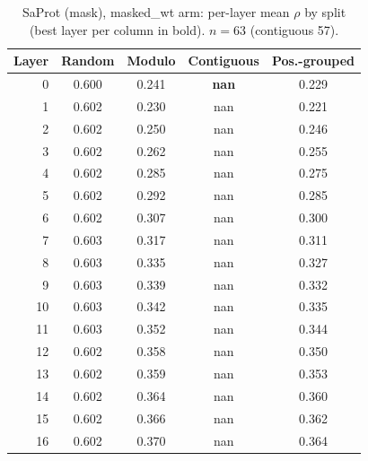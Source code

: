 \documentclass[11pt,a4paper]{article}
\begin{document}
\begin{table}[H]\centering\small

\caption{SaProt (mask), masked\_wt arm: per-layer mean $\rho$ by split (best layer per column in bold). $n=63$ (contiguous 57).}

\label{tab:S2SaProtmaskmasked_wt}

\begin{tabular}{rcccc}

\toprule

Layer & Random & Modulo & Contiguous & Pos.-grouped \\

\midrule

0 & 0.600 & 0.241 & \textbf{nan} & 0.229 \\

1 & 0.602 & 0.230 & nan & 0.221 \\

2 & 0.602 & 0.250 & nan & 0.246 \\

3 & 0.602 & 0.262 & nan & 0.255 \\

4 & 0.602 & 0.285 & nan & 0.275 \\

5 & 0.602 & 0.292 & nan & 0.285 \\

6 & 0.602 & 0.307 & nan & 0.300 \\

7 & 0.603 & 0.317 & nan & 0.311 \\

8 & 0.603 & 0.335 & nan & 0.327 \\

9 & 0.603 & 0.339 & nan & 0.332 \\

10 & 0.603 & 0.342 & nan & 0.335 \\

11 & 0.603 & 0.352 & nan & 0.344 \\

12 & 0.602 & 0.358 & nan & 0.350 \\

13 & 0.602 & 0.359 & nan & 0.353 \\

14 & 0.602 & 0.364 & nan & 0.360 \\

15 & 0.602 & 0.366 & nan & 0.362 \\

16 & 0.602 & 0.370 & nan & 0.364 \\


\end{tabular}
\end{table}
\end{document}
